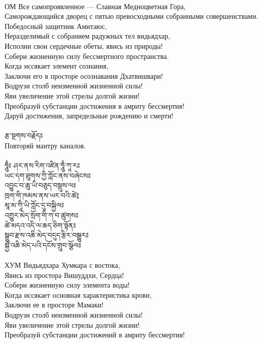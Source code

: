 \\
ОМ  Все самопроявленное — Славная Медноцветная Гора,\\
Саморождающийся дворец с пятью превосходными собранными совершенствами.\\
Победосный защитник Амитаюс, \\
Неразделимый с собранием радужных тел видьядхар,\\
Исполни свои сердечные обеты, явись из природы!\\
Собери жизненную силу бессмертного пространства.\\
Когда иссякает элемент сознания,\\
Заключи его в просторе осознавания Дхатвишвари!\\
Водрузи столб неизменной жизненной силы!\\
Яви увеличение этой стрелы долгой жизни!\\
Преобразуй субстанции достижения в амриту бессмертия!\\
Даруй достижения, запредельные рождению и смерти!\\
\\
{\ti རྩ་སྔགས་བརྗོདཿ\\}
Повторяй мантру каналов.\\
 \\
{\ti
ཧཱུྃཿ ཤར་ནས་རིག་འཛིན་ཧཱུྃ་ཀཱ་རཿ \\
ཡང་དག་ཐུགས་ཀྱི་ཀློང་ནས་བཞེངསཿ \\
འབྱུང་བ་ཆུ་ཡི་བཅུད་བསྡུས་ལཿ \\
ཁྲག་གི་ཁམས་ནས་ཡར་བའི་ཚེ༔ \\
མཱ་མ་ཀཱི་ཡི་ཀློང་དུ་བསྐྱིལཿ \\
འགྱུར་མེད་སྲོག་གི་ཀ་བ་ཚུགསཿ \\
ཚེ་མདའ་འདི་ལ་ཆད་ཅིག་སྟོནཿ \\
སྒྲུབ་རྫས་འཆི་མེད་བདུད་རྩིར་བསྒྱུརཿ \\
སྐྱེ་འཆི་མེད་པའི་དངོས་གྲུབ་སྩོལཿ \\}
\\
ХУМ  Видьядхара Хумкара с востока,\\
Явись из простора Вишуддхи, Сердца!\\
Собери жизненную силу элемента воды!\\
Когда иссякает основная характеристика крови,\\
Заключи ее в просторе Мамаки!\\
Водрузи столб неизменной жизненной силы!\\
Яви увеличение этой стрелы долгой жизни!\\
Преобразуй субстанции достижений в амриту бессмертия!\\

